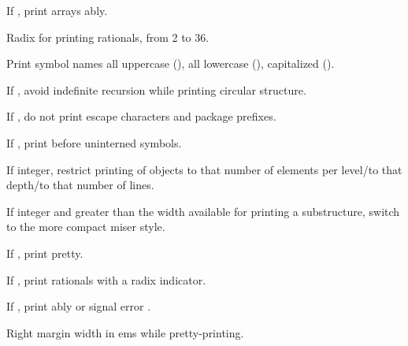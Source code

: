 \begin{LIST}{1cm}
  {
  If \T, print arrays ably.
  }

  {
  Radix for printing rationals, from 2 to 36.
  }

  {
  Print symbol names all uppercase (), all lowercase
  (), capitalized ().
  }

  {
  If \T, avoid indefinite recursion while printing circular
  structure. 
  }

  {
  If \NIL, do not print escape characters and package prefixes.
  }

  {
  If \T, print \kwd{\#:} before uninterned symbols.
  }

  {
  If integer, restrict printing of objects to that number of elements per
  level/to that depth/to that number of lines.
  }

  {
    If integer and greater than the width available for printing a
    substructure, switch to the more compact miser style.
  }

  {
  If \T, print pretty.
  }

  {
  If \T, print rationals with a radix indicator.
  }

  {
  If \T, print ably or signal error
  . 
  }

  {
  Right margin width in ems while pretty-printing.
  }


\end{LIST}
